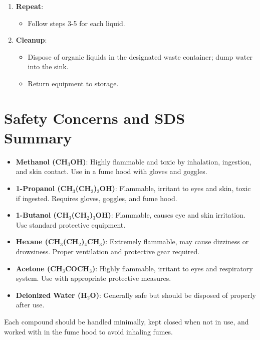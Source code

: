 \documentclass{article}
\begin{document}
\begin{enumerate}
    \item \textbf{Repeat}:
    \begin{itemize}
        \item Follow steps 3-5 for each liquid.
    \end{itemize}

    \item \textbf{Cleanup}:
    \begin{itemize}
        \item Dispose of organic liquids in the designated waste container; dump water into the sink.
        \item Return equipment to storage.
    \end{itemize}
\end{enumerate}

\section*{Safety Concerns and SDS Summary}
\begin{itemize}
    \item \textbf{Methanol (CH$_3$OH)}: Highly flammable and toxic by inhalation, ingestion, and skin contact. Use in a fume hood with gloves and goggles.
    \item \textbf{1-Propanol (CH$_3$(CH$_2$)$_2$OH)}: Flammable, irritant to eyes and skin, toxic if ingested. Requires gloves, goggles, and fume hood.
    \item \textbf{1-Butanol (CH$_3$(CH$_2$)$_3$OH)}: Flammable, causes eye and skin irritation. Use standard protective equipment.
    \item \textbf{Hexane (CH$_3$(CH$_2$)$_4$CH$_3$)}: Extremely flammable, may cause dizziness or drowsiness. Proper ventilation and protective gear required.
    \item \textbf{Acetone (CH$_3$COCH$_3$)}: Highly flammable, irritant to eyes and respiratory system. Use with appropriate protective measures.
    \item \textbf{Deionized Water (H$_2$O)}: Generally safe but should be disposed of properly after use.
\end{itemize}

Each compound should be handled minimally, kept closed when not in use, and worked with in the fume hood to avoid inhaling fumes.
\end{document}
